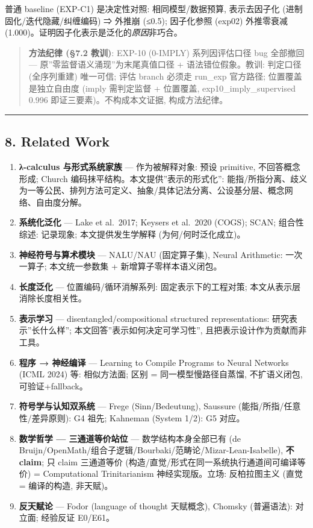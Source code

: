 \documentclass[
]{article}
\providecommand{\tightlist}{%
  \setlength{\itemsep}{0pt}\setlength{\parskip}{0pt}}
\begin{document}
普通 baseline (EXP-C1) 是决定性对照: 相同模型/数据预算, 表示去因子化
(进制固化/迭代隐藏/纠缠编码) ⇒ 外推崩 (≤0.5); 因子化参照 (exp02)
外推零衰减 (1.000)。证明因子化表示是泛化的\emph{原因}非巧合。

\begin{quote}
\textbf{方法纪律 (§7.2 教训)}: EXP-10 (0-IMPLY) 系列因评估口径 bug
全部撤回 --- 原''零监督语义涌现''为末尾真值口径 + 语法错位假象。教训:
判定口径 (全序列重建) 唯一可信; 评估 branch 必须走 run\_exp 官方路径;
位置覆盖是独立自由度 (imply 需判定监督 + 位置覆盖,
exp10\_imply\_supervised 0.996 即证三要素)。不构成本文证据,
构成方法纪律。
\end{quote}

\begin{center}\rule{0.5\linewidth}{0.5pt}\end{center}

\subsection{8. Related Work}\label{related-work}

\begin{enumerate}
\def\labelenumi{\arabic{enumi}.}
\tightlist
\item
  \textbf{λ-calculus 与形式系统家族} --- 作为被解释对象: 预设 primitive,
  不回答概念形成; Church 编码抹平结构。本文提供''表示的形式化'':
  能指/所指分离、歧义为一等公民、排列方法可定义、抽象/具体记法分离、公设基分层、概念网络、自由度分解。
\item
  \textbf{系统化泛化} --- Lake et al.~2017; Keysers et al.~2020 (COGS);
  SCAN; 组合性综述: 记录现象; 本文提供发生学解释 (为何/何时泛化成立)。
\item
  \textbf{神经符号与算术模块} --- NALU/NAU (固定算子集), Neural
  Arithmetic: 一次一算子; 本文统一参数集 + 新增算子零样本语义闭包。
\item
  \textbf{长度泛化} --- 位置编码/循环消解系列: 固定表示下的工程对策;
  本文从表示层消除长度相关性。
\item
  \textbf{表示学习} --- disentangled/compositional structured
  representations: 研究表示''长什么样'';
  本文回答''表示如何决定可学习性'', 且把表示设计作为贡献而非工具。
\item
  \textbf{程序 → 神经编译} --- Learning to Compile Programs to Neural
  Networks (ICML 2024) 等: 相似方法面; 区别 = 同一模型慢路径自蒸馏,
  不扩语义闭包, 可验证+fallback。
\item
  \textbf{符号学与认知双系统} --- Frege (Sinn/Bedeutung), Saussure
  (能指/所指/任意性/差异原则): G4 祖先; Kahneman (System 1/2): G5 对应。
\item
  \textbf{数学哲学 --- 三通道等价站位} --- 数学结构本身全部已有 (de
  Bruijn/OpenMath/组合子逻辑/Bourbaki/范畴论/Mizar-Lean-Isabelle),
  \textbf{不 claim}; 只 claim 三通道等价
  (构造/直觉/形式在同一系统执行通道间可编译等价) = Computational
  Trinitarianism 神经实现版。立场: 反柏拉图主义 (直觉 = 编译的构造,
  非天赋)。
\item
  \textbf{反天赋论} --- Fodor (language of thought 天赋概念), Chomsky
  (普遍语法): 对立面; 经验反证 E0/E61。
\end{enumerate}
\end{document}

